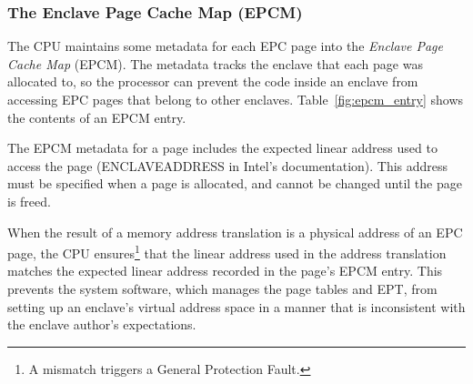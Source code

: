 \subsubsection{The Enclave Page Cache Map (EPCM)}
\label{sec:epcm}

The CPU maintains some metadata for each EPC page into the \textit{Enclave Page
Cache Map} (EPCM). The metadata tracks the enclave that each page was allocated
to, so the processor can prevent the code inside an enclave from accessing EPC
pages that belong to other enclaves. Table~\ref{fig:epcm_entry} shows the
contents of an EPCM entry.


\begin{table}[hbt]
  \caption{
    The fields in an EPCM entry.
  }
  \label{fig:epcm_entry}
\end{table}



The EPCM metadata for a page includes the expected linear address used to
access the page (ENCLAVEADDRESS in Intel's documentation). This address must be
specified when a page is allocated, and cannot be changed until the page is
freed.

When the result of a memory address translation is a physical address of an EPC
page, the CPU ensures\footnote{A mismatch triggers a General Protection Fault.}
that the linear address used in the address translation matches the expected
linear address recorded in the page's EPCM entry. This prevents the system
software, which manages the page tables and EPT, from setting up an enclave's
virtual address space in a manner that is inconsistent with the enclave
author's expectations.


